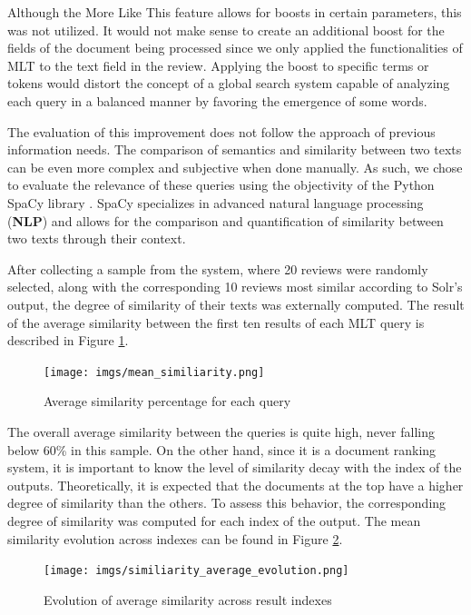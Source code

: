 \documentclass[sigconf]{acmart}
\begin{document}
Although the More Like This feature allows for boosts in certain parameters, this was not utilized. It would not make sense to create an additional boost for the fields of the document being processed since we only applied the functionalities of MLT to the text field in the review. Applying the boost to specific terms or tokens would distort the concept of a global search system capable of analyzing each query in a balanced manner by favoring the emergence of some words.

The evaluation of this improvement does not follow the approach of previous information needs. The comparison of semantics and similarity between two texts can be even more complex and subjective when done manually. As such, we chose to evaluate the relevance of these queries using the objectivity of the Python SpaCy library \cite{Python_Spacy}. SpaCy specializes in advanced natural language processing (\textbf{NLP}) and allows for the comparison and quantification of similarity between two texts through their context.

After collecting a sample from the system, where 20 reviews were randomly selected, along with the corresponding 10 reviews most similar according to Solr's output, the degree of similarity of their texts was externally computed. The result of the average similarity between the first ten results of each MLT query is described in Figure \ref{fig:avg_simi}.

\begin{figure}[h]
  \centering
  \texttt{[image: imgs/mean\_similiarity.png]}
  \caption{Average similarity percentage for each query}
  \label{fig:avg_simi}
\end{figure}


The overall average similarity between the queries is quite high, never falling below 60\% in this sample. On the other hand, since it is a document ranking system, it is important to know the level of similarity decay with the index of the outputs. Theoretically, it is expected that the documents at the top have a higher degree of similarity than the others. To assess this behavior, the corresponding degree of similarity was computed for each index of the output. The mean similarity evolution across indexes can be found in Figure \ref{fig:simi_avg_evo}.


\begin{figure}[h]
  \centering
  \texttt{[image: imgs/similiarity\_average\_evolution.png]}
  \caption{Evolution of average similarity across result indexes}
  \label{fig:simi_avg_evo}
\end{figure}
\end{document}

